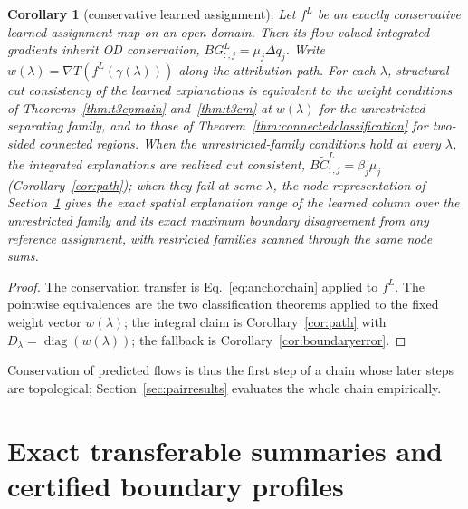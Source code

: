 \documentclass[a4paper,fleqn]{cas-sc}
\newtheorem{corollary}[theorem]{Corollary}
\begin{document}
\begin{corollary}[conservative learned assignment]\label{cor:learned}
Let $f^L$ be an exactly conservative learned assignment map on an open
domain. Then its flow-valued integrated gradients inherit OD
conservation, $BG^L_{:,j}=\mu_j\Delta q_j$. Write
$w(\lambda)=\nabla T(f^L(\gamma(\lambda)))$ along the attribution path.
For each $\lambda$, structural cut consistency of the learned
explanations is equivalent to the weight conditions of
Theorems~\ref{thm:t3cpmain} and~\ref{thm:t3cm} at $w(\lambda)$ for the
unrestricted separating family, and to those of
Theorem~\ref{thm:connectedclassification} for two-sided connected
regions. When the unrestricted-family conditions hold at every
$\lambda$, the integrated explanations are realized cut consistent,
$B\widetilde C^{L}_{:,j}=\beta_j\mu_j$
(Corollary~\ref{cor:path}); when they fail at some $\lambda$, the node
representation of Section~\ref{sec:stability} gives the exact spatial
explanation range of the learned column over the unrestricted family
and its exact maximum boundary disagreement from any reference
assignment, with restricted families scanned through the same node
sums.
\end{corollary}
\begin{proof}
The conservation transfer is Eq.~\eqref{eq:anchorchain} applied to
$f^L$. The pointwise equivalences are the two classification theorems
applied to the fixed weight vector $w(\lambda)$; the integral claim is
Corollary~\ref{cor:path} with
$D_\lambda=\operatorname{diag}(w(\lambda))$; the fallback is
Corollary~\ref{cor:boundaryerror}.
\end{proof}
Conservation of predicted flows is thus the first step of a chain whose
later steps are topological; Section~\ref{sec:pairresults} evaluates the
whole chain empirically.

\section{Exact transferable summaries and certified boundary profiles}\label{sec:stability}\label{sec:algorithm}
\end{document}
